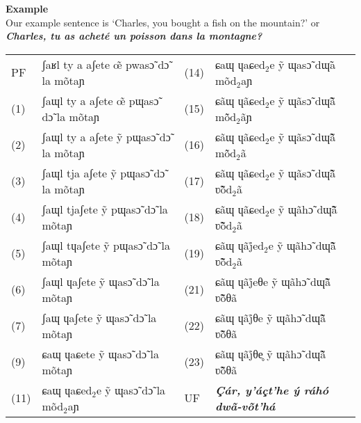 \documentclass[a4paper, 12pt, oneside, final]{article}
\def\parheading#1{\noindent\textbf{#1}}
\begin{document}
\parheading{Example}\\
Our example sentence is ‘Charles, you bought a fish on the mountain?’ or \textbf{\textit{Charles, tu as acheté un pois\-son dans la montagne?}}\par\medskip
\noindent\begin{tabular}{@{}>{}l>{}l>{}l>{}l}
PF& ʃaʁl ty a aʃete œ̃ pwasɔ̃ dɔ̃ la mõtaɲ &(14)& ɕaɰ ɥaɕed$_2$e ỹ ɰasɔ̃ dɰ̃a mõd$_2$aɲ \\
(1)&ʃaɰl ty a aʃete œ̃ pɰasɔ̃ dɔ̃ la mõtaɲ &(15)&ɕãɰ ɥãɕed$_2$e ỹ ɰãsɔ̃ dɰ̃ã̃ mõ̃d$_2$ãɲ \\
(2)&ʃaɰl ty a aʃete ỹ pɰasɔ̃ dɔ̃ la mõtaɲ &(16)&ɕãɰ ɥãɕed$_2$e ỹ ɰãsɔ̃ dɰ̃ã̃ mõ̃d$_2$ã \\
(3)&ʃaɰl tja aʃete ỹ pɰasɔ̃ dɔ̃ la mõtaɲ &(17)&ɕãɰ ɥãɕed$_2$e ỹ ɰãsɔ̃ dɰ̃ã̃ ʋ̃õ̃d$_2$ã \\
(4)&ʃaɰl tjaʃete ỹ pɰasɔ̃ dɔ̃ la mõtaɲ &(18)&ɕãɰ ɥãɕed$_2$e ỹ ɰãhɔ̃ dɰ̃ã̃ ʋ̃õ̃d$_2$ã \\
(5)&ʃaɰl tɥaʃete ỹ pɰasɔ̃ dɔ̃ la mõtaɲ &(19)&ɕãɰ ɥãj̊ed$_2$e ỹ ɰãhɔ̃ dɰ̃ã̃ ʋ̃õ̃d$_2$ã \\
(6)&ʃaɰl ɥaʃete ỹ ɰasɔ̃ dɔ̃ la mõtaɲ &(21)&ɕãɰ ɥãj̊eθe ỹ ɰãhɔ̃ dɰ̃ã̃ ʋ̃õ̃θã \\
(7)&ʃaɰ ɥaʃete ỹ ɰasɔ̃ dɔ̃ la mõtaɲ &(22)&ɕãɰ ɥãj̊θe ỹ ɰãhɔ̃ dɰ̃ã̃ ʋ̃õ̃θã \\
(9)&ɕaɰ ɥaɕete ỹ ɰasɔ̃ dɔ̃ la mõtaɲ &(23)&ɕãɰ ɥãj̊θe̥ ỹ ɰãhɔ̃ dɰ̃ã̃ ʋ̃õ̃θã \\
(11)&ɕaɰ ɥaɕed$_2$e ỹ ɰasɔ̃ dɔ̃ la mõd$_2$aɲ &UF&\bfseries\itshape Çár, y’áçt’he ý ráhó dwã-võt’há \\
\end{tabular}
\end{document}
